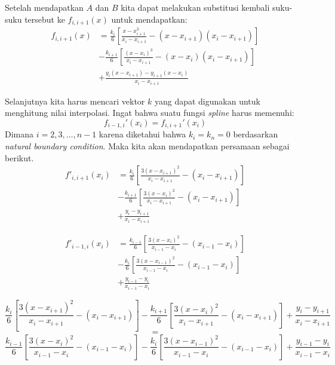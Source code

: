 \documentclass[journal,12pt,onecolumn,a4paper]{IEEEtran}
\begin{document}
Setelah mendapatkan \(A\) dan \(B\) kita dapat melakukan substitusi kembali suku-suku tersebut ke \(f_{i, i+1}(x)\) untuk mendapatkan:
\begin{equation}
	\begin{split}
		f_{i, i+1}(x) & = \frac{k_i}{6}[\frac{x-x_{i+1}^3}{x_i-x_{i+1}} - (x - x_{i+1})(x_i - x_{i+1})]\\
		& - \frac{k_{i+1}}{6}[\frac{(x-x_i)^3}{x_i - x_{i+1}} - (x-x_i)(x_i - x_{i+1})]\\
		& + \frac{y_i(x-x_{i+1}) - y_{i+1}(x-x_i)}{x_i - x_{i+1}}
	\end{split}
\end{equation}

Selanjutnya kita harus mencari vektor \(k\) yang dapat digunakan untuk menghitung nilai interpolasi. Ingat bahwa suatu fungsi \emph{spline} harus memenuhi:
\begin{equation*}
	f_{i-1, i}'(x_i) = f_{i, i+1}'(x_i)
\end{equation*}
Dimana \(i = 2, 3, \dots, n-1\) karena diketahui bahwa \(k_i = k_n = 0\) berdasarkan \emph{natural boundary condition}. Maka kita akan mendapatkan persamaan sebagai berikut.
\begin{equation*}
	\begin{split}
		f'_{i, i+1}(x_i) & = \frac{k_i}{6}[\frac{3(x-x_{i+1})^2}{x_i - x_{i+1}} - (x_i - x_{i+1})]\\
		& - \frac{k_{i+1}}{6}[\frac{3(x-x_i)^2}{x_i - x_{i+1}} - (x_i - x_{i+1})]\\
		& + \frac{y_i - y_{i+1}}{x_i - x_{i+1}}
	\end{split}
\end{equation*}

\begin{equation*}
	\begin{split}
		f'_{i-1, i}(x_i) & = \frac{k_{i-1}}{6}[\frac{3(x-x_{i})^2}{x_{i-1} - x_{i}} - (x_{i-1} - x_{i})]\\
		& - \frac{k_{i}}{6}[\frac{3(x-x_{i-1})^2}{x_{i-1} - x_{i}} - (x_{i-1} - x_{i})]\\
		& + \frac{y_{i-1} - y_{i}}{x_{i-1} - x_{i}}
	\end{split}
\end{equation*}

\begin{equation*}
	\frac{k_i}{6}[\frac{3(x-x_{i+1})^2}{x_i - x_{i+1}} - (x_i - x_{i+1})] - \frac{k_{i+1}}{6}[\frac{3(x-x_i)^2}{x_i - x_{i+1}} - (x_i - x_{i+1})] + \frac{y_i - y_{i+1}}{x_i - x_{i+1}}
\end{equation*}
\begin{equation*}
	=
\end{equation*}
\begin{equation*}
	\frac{k_{i-1}}{6}[\frac{3(x-x_{i})^2}{x_{i-1} - x_{i}} - (x_{i-1} - x_{i})] - \frac{k_{i}}{6}[\frac{3(x-x_{i-1})^2}{x_{i-1} - x_{i}} - (x_{i-1} - x_{i})] + \frac{y_{i-1} - y_{i}}{x_{i-1} - x_{i}}
\end{equation*}
\end{document}
